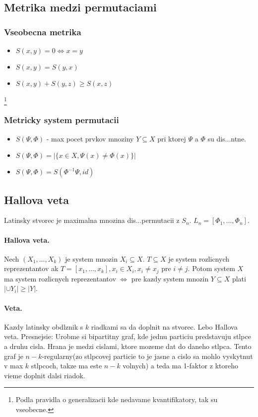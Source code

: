 \documentclass[10pt,a4paper]{article}
\begin{document}
\subsection{Metrika medzi permutaciami}
\subsubsection{Vseobecna metrika}
\begin{itemize}
\item $S(x,y)=0 \Leftrightarrow x=y$
\item $S(x,y)=S(y,x)$
\item $S(x,y)+S(y,z) \geq S(x,z)$
\end{itemize}
\footnote{
Podla pravidla o generalizacii kde nedavame kvantifikatory, tak su vseobecne.
}

\subsubsection{Metricky system permutacii}
\begin{itemize}
\item $S(\Psi, \Phi)$ - max pocet prvkov mnoziny $Y \subseteq X$ pri ktorej $\Psi$ a $\Phi$ su dis...ntne.
\item $S(\Psi, \Phi) = |\{x \in X, \Psi(x) \neq \Phi(x)\}|$
\item $S(\Psi, \Phi) = S(\Phi^{-1}\Psi, id)$
\end{itemize}

\subsection{Hallova veta}
Latinsky stvorec je maximalna mnozina dis...permutacii z $S_n$. $L_n = [\Phi_1, \ldots, \Phi_n]$.
\paragraph{Hallova veta.}
Nech $(X_1, \ldots, X_k)$ je system mnozin $X_i \subseteq X$. $T \subseteq X$ je system rozlicnych reprezentantov ak $T=[x_1, \ldots, x_k], x_i \in X_i, x_i \neq x_j$ pre $i \neq j$. Potom system $X$ ma system rozlicnych reprezentantov $\Leftrightarrow$ pre kazdy system mnozin $Y \subseteq X$ plati $|\cup Y_i| \geq |Y|$.

\paragraph{Veta.}
Kazdy latinsky obdlznik s $k$ riadkami sa da doplnit na stvorec. Lebo Hallova veta. Presnejsie:
Urobme si bipartitny graf, kde jednu particiu predstavuju stlpce a druhu cisla.
Hrana je medzi cislami, ktore mozeme dat do daneho stlpca.
Tento graf je $n-k$-regularny(zo stlpcovej particie to je jasne a cislo sa mohlo vyskytnut v max
$k$ stlpcoch, takze ma este $n-k$ volnych) a teda ma 1-faktor z ktoreho vieme doplnit dalsi riadok.
\end{document}
